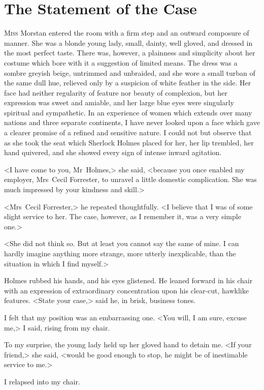 \chapter{The Statement of the Case}
\lettrine{M}{iss} Morstan entered the room with a firm step and an outward composure of manner. She was a blonde young lady, small, dainty, well gloved, and dressed in the most perfect taste. There was, however, a plainness and simplicity about her costume which bore with it a suggestion of limited means. The dress was a sombre greyish beige, untrimmed and unbraided, and she wore a small turban of the same dull hue, relieved only by a suspicion of white feather in the side. Her face had neither regularity of feature nor beauty of complexion, but her expression was sweet and amiable, and her large blue eyes were singularly spiritual and sympathetic. In an experience of women which extends over many nations and three separate continents, I have never looked upon a face which gave a clearer promise of a refined and sensitive nature. I could not but observe that as she took the seat which Sherlock Holmes placed for her, her lip trembled, her hand quivered, and she showed every sign of intense inward agitation.

<I have come to you, Mr~Holmes,> she said, <because you once enabled my employer, Mrs~Cecil Forrester, to unravel a little domestic complication. She was much impressed by your kindness and skill.>

<Mrs~Cecil Forrester,> he repeated thoughtfully. <I believe that I was of some slight service to her. The case, however, as I remember it, was a very simple one.>

<She did not think so. But at least you cannot say the same of mine. I can hardly imagine anything more strange, more utterly inexplicable, than the situation in which I find myself.>

Holmes rubbed his hands, and his eyes glistened. He leaned forward in his chair with an expression of extraordinary concentration upon his clear-cut, hawklike features. <State your case,> said he, in brisk, business tones.

I felt that my position was an embarrassing one. <You will, I am sure, excuse me,> I said, rising from my chair.

To my surprise, the young lady held up her gloved hand to detain me. <If your friend,> she said, <would be good enough to stop, he might be of inestimable service to me.>

I relapsed into my chair.

